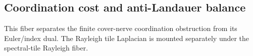 \subsection{Coordination cost and anti-Landauer balance}

This fiber separates the finite cover-nerve coordination obstruction from its
Euler/index dual. The Rayleigh tile Laplacian is mounted separately under the
spectral-tile Rayleigh fiber.




